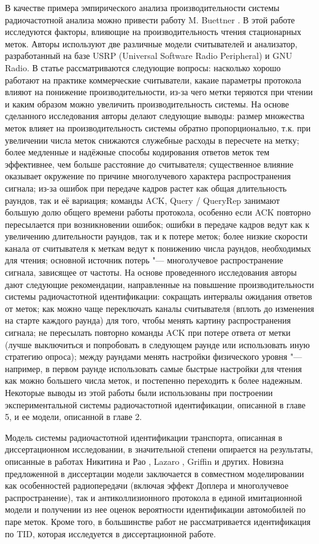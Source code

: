 В качестве примера эмпирического анализа производительности системы радиочастотной анализа можно привести работу M. Buettner \cite{Buettner2008}. В этой работе исследуются факторы, влияющие на производительность чтения стационарных меток. Авторы используют две различные модели считывателей и анализатор, разработанный на базе USRP (Universal Software Radio Peripheral) и GNU Radio. В статье рассматриваются следующие вопросы: насколько хорошо работают на практике коммерческие считыватели, какаие параметры протокола влияют на понижение производительности, из-за чего метки теряются при чтении и каким образом можно увеличить производительность системы. На основе сделанного исследования авторы делают следующие выводы: размер множества меток влияет на производительность системы обратно пропорционально, т.к. при увеличении числа меток снижаются служебные расходы в пересчете на метку; более медленные и надёжные способы кодирования ответов меток тем эффективнее, чем больше расстояние до считывателя; существенное влияние оказывает окружение по причине многолучевого характера распространения сигнала; из-за ошибок при передаче кадров растет как общая длительность раундов, так и её вариация; команды ACK, Query / QueryRep занимают большую долю общего времени работы протокола, особенно если ACK повторно пересылается при возникновении ошибок; ошибки в передаче кадров ведут как к увеличению длительности раундов, так и к потере меток; более низкие скорости канала от считывателя к меткам ведут к понижению числа раундов, необходимых для чтения; основной источник потерь "--- многолучевое распространение сигнала, зависящее от частоты. На основе проведенного исследования авторы дают следующие рекомендации, направленные на повышение производительности системы радиочастотной идентификации: сокращать интервалы ожидания ответов от меток; как можно чаще переключать каналы считывателя (вплоть до изменения на старте каждого раунда) для того, чтобы менять картину распространения сигнала; не пересылать повторно команды ACK при потере ответа от метки (лучше выключиться и попробовать в следующем раунде или использовать иную стратегию опроса); между раундами менять настройки физического уровня "--- например, в первом раунде использовать самые быстрые настройки для чтения как можно большего числа меток, и постепенно переходить к более надежным. Некоторые выводы из этой работы были использованы при построении экспериментальной системы радиочастотной идентификации, описанной в главе 5, и ее модели, описанной в главе 2.


Модель системы радиочастотной идентификации транспорта, описанная в диссертационном исследовании, в значительной степени опирается на результаты, описанные в работах Никитина и Рао \cite{Nikitin2008}, Lazaro \cite{Lazaro2009}, Griffin \cite{Griffin2009} и других. Новизна предложенной в диссертации модели заключается в совместном моделировании как особенностей радиопередачи (включая эффект Доплера и многолучевое распространение), так и антиколлизионного протокола в единой имитационной модели и получении из нее оценок вероятности идентификации автомобилей по паре меток. Кроме того, в большинстве работ не рассматривается идентификация по TID, которая исследуется в диссертационной работе.



